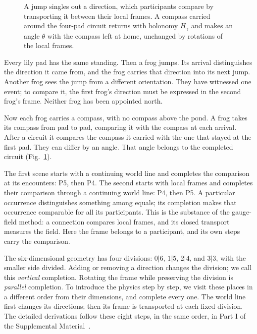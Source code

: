 \documentclass[aps,prx,reprint,longbibliography]{revtex4-2}
\begin{document}
\begin{figure}[t]
\caption{A jump singles out a direction, which participants compare by transporting it between their local frames. A compass carried around the four-pad circuit returns with holonomy $H_\gamma$ and makes an angle $\theta$ with the compass left at home, unchanged by rotations of the local frames.}
\label{fig:frog-scenes}
\end{figure}

Every lily pad has the same standing. Then a frog jumps. Its arrival distinguishes the direction it came from, and the frog carries that direction into its next jump. Another frog sees the jump from a different orientation. They have witnessed one event; to compare it, the first frog's direction must be expressed in the second frog's frame. Neither frog has been appointed north.

Now each frog carries a compass, with no compass above the pond. A frog takes its compass from pad to pad, comparing it with the compass at each arrival. After a circuit it compares the compass it carried with the one that stayed at the first pad. They can differ by an angle. That angle belongs to the completed circuit (Fig.~\ref{fig:frog-scenes}).

The first scene starts with a continuing world line and completes the comparison at its encounters: P5, then P4. The second starts with local frames and completes their comparison through a continuing world line: P4, then P5. A particular occurrence distinguishes something among equals; its completion makes that occurrence comparable for all its participants. This is the substance of the gauge-field method: a connection compares local frames, and its closed transport measures the field. Here the frame belongs to a participant, and its own steps carry the comparison.

The six-dimensional geometry has four divisions: $0|6$, $1|5$, $2|4$, and $3|3$, with the smaller side divided. Adding or removing a direction changes the division; we call this \emph{vertical} completion. Rotating the frame while preserving the division is \emph{parallel} completion. To introduce the physics step by step, we visit these places in a different order from their dimensions, and complete every one. The world line first changes its directions; then its frame is transported at each fixed division. The detailed derivations follow these eight steps, in the same order, in Part I of the Supplemental Material~\cite{SI}.
\end{document}
